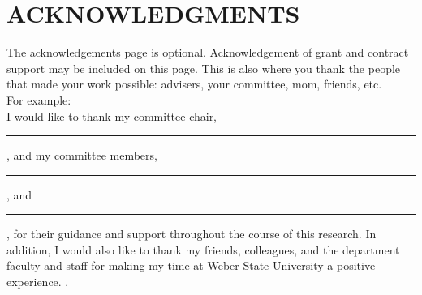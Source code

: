 
\chapter*{ACKNOWLEDGMENTS}
\vspace{7mm}

The acknowledgements page is optional. Acknowledgement of grant and contract support may be included on this page. This is also where you thank the people that made your work possible: advisers, your committee, mom, friends, etc.\\ 

For example:\\
 I would like to thank my committee chair, \rule{2in}{.5pt}, and my committee members,  \rule{2in}{.5pt}, and\rule{2in}{.5pt}, for their guidance and support throughout the course of this research.
In addition, I would also like to thank my friends, colleagues, and the department faculty and staff for making my time at Weber State University a positive experience.
. 
